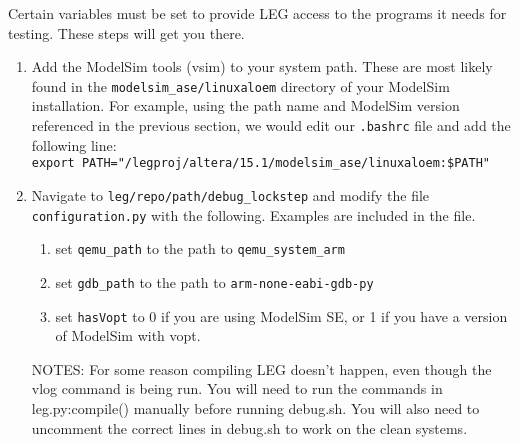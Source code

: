 Certain variables must be set to provide LEG access to the programs it needs for testing.
These steps will get you there.

\begin{enumerate}
\item Add the ModelSim tools (vsim) to your system path.
These are most likely found in the \texttt{modelsim\_ase/linuxaloem} directory of your ModelSim installation.
For example, using the path name and ModelSim version referenced in the previous section, we would edit our \texttt{.bashrc} file and add the following line: \\\texttt{export PATH="/legproj/altera/15.1/modelsim\_ase/linuxaloem:\$PATH"}

\item Navigate to \texttt{leg/repo/path/debug\_lockstep} and modify the file \texttt{config\-uration.py} with the following. 
Examples are included in the file.
	\begin{enumerate}
		\item set \texttt{qemu\_path} to the path to \texttt{qemu\_system\_arm}
		\item set \texttt{gdb\_path} to the path to \texttt{arm-none-eabi-gdb-py}
		\item set \texttt{hasVopt} to 0 if you are using ModelSim SE, or 1 if you have a version of ModelSim with vopt.
	\end{enumerate}

NOTES: For some reason compiling LEG doesn't happen, even though the vlog command is being run. 
You will need to run the commands in leg.py:compile() manually before running debug.sh.
You will also need to uncomment the correct lines in debug.sh to work on the clean systems. 
\end{enumerate}









